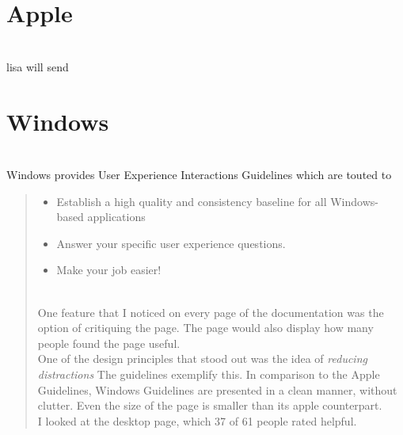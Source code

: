 \documentclass[12pt, oneside, letterpaper]{report}
\begin{document}
\section*{Apple} ~\\
lisa will send

\section*{Windows} ~\\
Windows provides User Experience Interactions Guidelines which are touted to 
\begin{quote}
\begin{itemize}
\item Establish a high quality and consistency baseline for all Windows-based applications
\item Answer your specific user experience questions.
\item Make your job easier!
\end{itemize}
~\\
One feature that I noticed on every page of the documentation was the option of critiquing the page.  The page would also display how many people found the page useful.  \\
One of the design principles that stood out was the idea of \textit{reducing distractions} The guidelines exemplify this. In comparison to the Apple Guidelines, Windows Guidelines are presented in a clean manner, without clutter. Even the size of the page is smaller than its apple counterpart. \\
I looked at the desktop page, which 37 of 61 people rated helpful.  



\end{quote}
\end{document}
